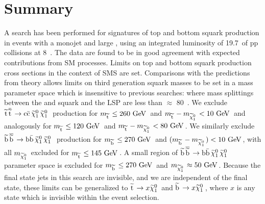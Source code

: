 \section{Summary}
A search has been performed for signatures of top and bottom squark production in events with a monojet and large \METmu, using an integrated luminosity of 19.7~\fbinv of pp collisions at 8~\TeV. 
The data are found to be in good agreement with expected contributions from \ac{SM} processes.  
Limits on top and bottom squark production cross sections in the context of \ac{SMS} are set. 
Comparisons with the predictions from theory allows limits on third generation squark masses to be set in a mass parameter space which is insensitive to previous searches: where mass splittings between the \sTop and \sBot squark and the LSP are less than $\approx$ 80~\GeV.  
We exclude $\ttwocc$ 
production for $m_{\sTop} \leq 260~\GeV$ and
$m_{\sTop} - m_{\chiOneZero} <10~\GeV$ 
and analogously for $m_{\sTop} \leq 120~\GeV$ and
$m_{\sTop} - m_{\chiOneZero} <80~\GeV$.
We similarly exclude $\ttwobb$ production for $m_{\sBot} \leq 270~\GeV$ and 
$(m_{\sBot} - m_{\chiOneZero}) <10~\GeV$, with all $m_{\chiOneZero}$ excluded for $m_{\sTop} \leq 145~\GeV$.
A small region of $\ttwobb$ parameter space is excluded for $m_{\sBot} \leq 270~\GeV$ and $m_{\chiOneZero} \approx 50~\GeV$.
Because the final state jets in this search are invisible, and we are independent of the final state, these limits can be generalized to $\sTop \rightarrow x \chiOneZero$ and $\sBot \rightarrow x \chiOneZero$, where $x$ is any state which is invisible within the event selection.



